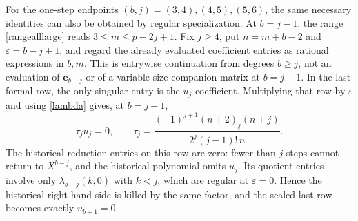 \documentclass[12pt]{article}
\theoremstyle{remark}
\newcommand{\fall}[2]{(#1)_{\underline{#2}}}
\begin{document}
For the one-step endpoints $(b,j)=(3,4),(4,5),(5,6)$, the same
necessary identities can also be obtained by regular specialization.
At $b=j-1$, the range \eqref{rangealllarge} reads
$3\le m\le p-2j+1$.
Fix $j\ge4$, put $n=m+b-2$ and $\varepsilon=b-j+1$, and regard the
already evaluated coefficient entries as rational expressions in
$b,m$.  This is entrywise continuation from degrees $b\ge j$, not
an evaluation of $\mathbf e_{b-j}$ or of a variable-size companion matrix at
$b=j-1$.  In the last formal row, the only singular entry is the
$u_j$-coefficient.  Multiplying that row by $\varepsilon$ and using
\eqref{lambda} gives, at $b=j-1$,
\[
 \tau_j u_j=0,
 \qquad
 \tau_j=\frac{(-1)^{j+1}\fall{n+2}{j}(n+j)}
                  {2^j(j-1)!\,n}.
\]
The historical reduction entries on this row are zero: fewer than $j$
steps cannot return to $X^{b-j}$, and the historical polynomial omits
$u_j$.  Its quotient entries involve only $\lambda_{b-j}(k,0)$ with
$k<j$, which are regular at $\varepsilon=0$.  Hence the historical right-hand
side is killed by the same factor, and the scaled last row becomes
exactly $u_{b+1}=0$.
\end{document}

